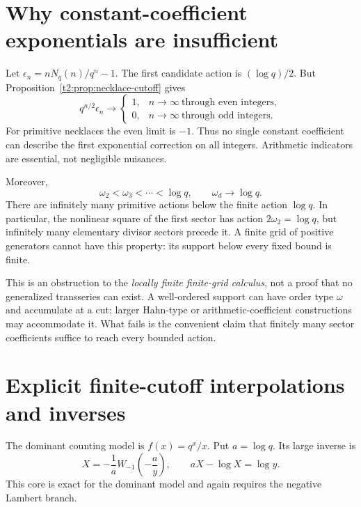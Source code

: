 \documentclass[11pt,openany]{book}
\numberwithin{equation}{chapter}
\theoremstyle{plain}
\theoremstyle{definition}
\theoremstyle{remark}
\begin{document}
\section{Why constant-coefficient exponentials are insufficient}

Let $\epsilon_n=nN_q(n)/q^n-1$. The first candidate action is $(\log q)/2$. But Proposition~\ref{t2:prop:necklace-cutoff} gives
\begin{equation}
 q^{n/2}\epsilon_n\longrightarrow
 \begin{cases}1,&n\to\infty\ \text{through even integers},\\
               0,&n\to\infty\ \text{through odd integers}.
 \end{cases}
 \label{t2:eq:necklace-parity-obstruction}
\end{equation}
For primitive necklaces the even limit is $-1$. Thus no single constant coefficient can describe the first exponential correction on all integers. Arithmetic indicators are essential, not negligible nuisances.

Moreover,
\begin{equation}
 \omega_2<\omega_3<\cdots<\log q,
 \qquad \omega_d\longrightarrow\log q.
 \label{t2:eq:necklace-action-accumulation}
\end{equation}
There are infinitely many primitive actions below the finite action $\log q$. In particular, the nonlinear square of the first sector has action $2\omega_2=\log q$, but infinitely many elementary divisor sectors precede it. A finite grid of positive generators cannot have this property: its support below every fixed bound is finite.

This is an obstruction to the \emph{locally finite finite-grid calculus}, not a proof that no generalized transseries can exist. A well-ordered support can have order type $\omega$ and accumulate at a cut; larger Hahn-type or arithmetic-coefficient constructions may accommodate it. What fails is the convenient claim that finitely many sector coefficients suffice to reach every bounded action.

\section{Explicit finite-cutoff interpolations and inverses}

The dominant counting model is $f(x)=q^x/x$. Put $a=\log q$. Its large inverse is
\begin{equation}
 X=-\frac1a W_{-1}\!\left(-\frac ay\right),
 \qquad aX-\log X=\log y.
 \label{t2:eq:necklace-core}
\end{equation}
This core is exact for the dominant model and again requires the negative Lambert branch.
\end{document}
